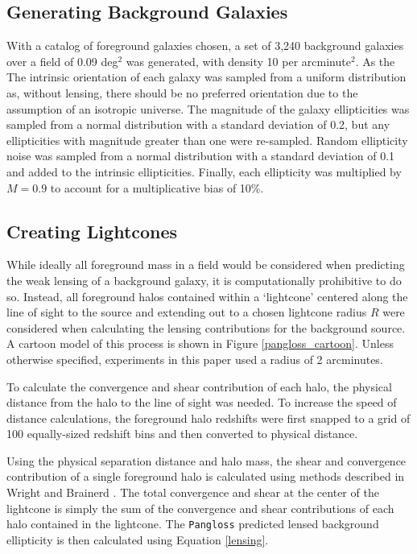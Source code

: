 \documentclass[%
 reprint,
 amsmath,amssymb,
 aps,nofootinbib
]{revtex4-1}
\begin{document}
\subsection*{Generating Background Galaxies}
With a catalog of foreground galaxies chosen, a set of 3,240 background galaxies over a field of 0.09 deg$^2$ was generated, with density 10 per arcminute$^2$. As the The intrinsic orientation of each galaxy was sampled from a uniform distribution as, without lensing, there should be no preferred orientation due to the assumption of an isotropic universe. The magnitude of the galaxy ellipticities was sampled from a normal distribution with a standard deviation of 0.2, but any ellipticities with magnitude greater than one were re-sampled. Random ellipticity noise was sampled from a normal distribution with a standard deviation of 0.1 and added to the intrinsic ellipticities. Finally, each ellipticity was multiplied by $M=0.9$ to account for a multiplicative bias of 10\%.

\subsection*{Creating Lightcones}

While ideally all foreground mass in a field would be considered when predicting the weak lensing of a background galaxy, it is computationally prohibitive to do so. Instead, all foreground halos contained within a `lightcone' centered along the line of sight to the source and extending out to a chosen lightcone radius $R$ were considered when calculating the lensing contributions for the background source. A cartoon model of this process is shown in Figure \ref{pangloss_cartoon}. Unless otherwise specified, experiments in this paper used a radius of 2 arcminutes.

To calculate the convergence and shear contribution of each halo, the physical distance from the halo to the line of sight was needed. To increase the speed of distance calculations, the foreground halo redshifts were first snapped to a grid of 100 equally-sized redshift bins and then converted to physical distance.

Using the physical separation distance and halo mass, the shear and convergence contribution of a single foreground halo is calculated using methods described in Wright and Brainerd \cite{lensing_calc}. The total convergence and shear at the center of the lightcone is simply the sum of the convergence and shear contributions of each halo contained in the lightcone. The \texttt{Pangloss} predicted lensed background ellipticity is then calculated using Equation \eqref{lensing}.
\end{document}
